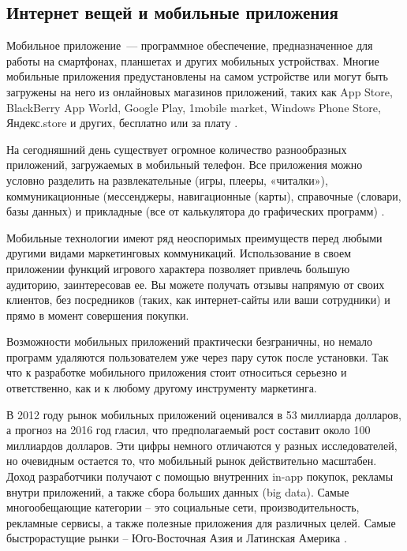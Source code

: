 \subsection{Интернет вещей и мобильные приложения}
\label{sec:subject:mobile}

Мобильное приложение~--- программное обеспечение, предназначенное для работы на смартфонах, планшетах и других мобильных устройствах. Многие мобильные приложения предустановлены на самом устройстве или могут быть загружены на него из онлайновых магазинов приложений, таких как App Store, BlackBerry App World, Google Play, 1mobile market, Windows Phone Store, Яндекс.store и других, бесплатно или за плату \cite{wiki_mobile_def}.

На сегодняшний день существует огромное количество разнообразных приложений, загружаемых в мобильный телефон. Все приложения можно условно разделить на развлекательные (игры, плееры, «читалки»), коммуникационные (мессенджеры, навигационные (карты), справочные (словари, базы данных) и прикладные (все от калькулятора до графических программ) \cite{mobile_business}.

Мобильные технологии имеют ряд неоспоримых преимуществ перед любыми другими видами маркетинговых коммуникаций. Использование в своем приложении функций игрового характера позволяет привлечь большую аудиторию, заинтересовав ее. Вы можете получать отзывы напрямую от своих клиентов, без посредников (таких, как интернет-сайты или ваши сотрудники) и прямо в момент совершения покупки.

Возможности мобильных приложений практически безграничны, но немало программ удаляются пользователем уже через пару суток после установки. Так что к разработке мобильного приложения стоит относиться серьезно и ответственно, как и к любому другому инструменту маркетинга.

В 2012 году рынок мобильных приложений оценивался в 53 миллиарда долларов, а прогноз на 2016 год гласил, что предполагаемый рост составит около 100 миллиардов долларов. Эти цифры немного отличаются у разных исследователей, но очевидным остается то, что мобильный рынок действительно масштабен. Доход разработчики получают с помощью внутренних in-app покупок, рекламы внутри приложений, а также сбора больших данных (big data). Самые многообещающие категории – это социальные сети, производительность, рекламные сервисы, а также полезные приложения для различных целей. Самые быстрорастущие рынки – Юго-Восточная Азия и Латинская Америка \cite{mobile_market}.

